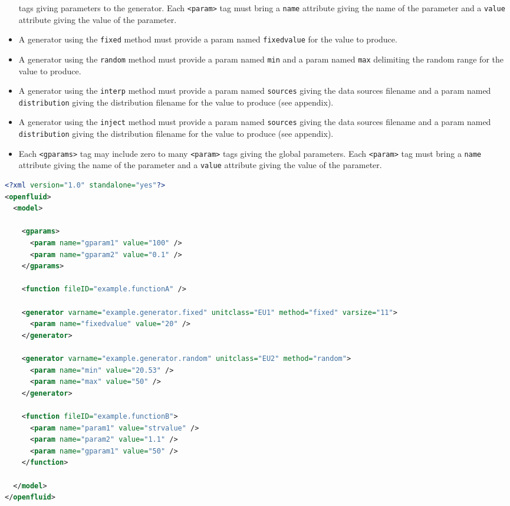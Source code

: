 \begin{itemize}
  tags giving parameters to the generator. Each \texttt{<param>} tag must bring
  a \texttt{name} attribute giving the name of the parameter and a \texttt{value} 
  attribute giving the value of the parameter.
  \item A generator using the \texttt{fixed} method must provide a
  param named \texttt{fixedvalue} for the value to produce.
  \item A generator using the \texttt{random} method must provide a
  param named \texttt{min} and a param named \texttt{max} delimiting the
  random range for the value to produce.
  \item A generator using the \texttt{interp} method must provide a
  param named \texttt{sources} giving the data sources filename and a param
  named \texttt{distribution} giving the distribution filename for the value to
  produce (see appendix).
  \item A generator using the \texttt{inject} method must provide a
  param named \texttt{sources} giving the data sources filename and a param
  named \texttt{distribution} giving the distribution filename for the value to
  produce (see appendix).  
  \item Each \texttt{<gparams>} tag may include zero to many \texttt{<param>}
  tags giving the global parameters. Each \texttt{<param>} tag
  must bring a \texttt{name} attribute giving the name of the parameter and a \texttt{value} 
  attribute giving the value of the parameter.
\end{itemize}

\begin{lstlisting}[language=xml,title=\footnotesize\textit{example}]
<?xml version="1.0" standalone="yes"?>
<openfluid>
  <model>

    <gparams>
      <param name="gparam1" value="100" />
      <param name="gparam2" value="0.1" />
    </gparams>

    <function fileID="example.functionA" />

    <generator varname="example.generator.fixed" unitclass="EU1" method="fixed" varsize="11">
      <param name="fixedvalue" value="20" />
    </generator>

    <generator varname="example.generator.random" unitclass="EU2" method="random">
      <param name="min" value="20.53" />
      <param name="max" value="50" />
    </generator>

    <function fileID="example.functionB">
      <param name="param1" value="strvalue" />
      <param name="param2" value="1.1" />
      <param name="gparam1" value="50" />
    </function>

  </model>
</openfluid>
\end{lstlisting}

